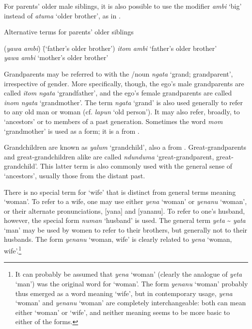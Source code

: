 For parents’ older male siblings, it is also possible to use the modifier \textit{ambi} ‘big’ instead of \textit{atuma} ‘older brother’, as in .

\ea%
    \label{ex:sem:24}
          Alternative terms for parents’ older siblings
\begin{tabbing}
{(\textit{yawa ambi})} \= {(‘father’s older brother’)}\kill
{\textit{itom ambi}} \> {‘father’s older brother’}\\
{\textit{yawa ambi}} \> {‘mother’s older brother’}
\end{tabbing}
\z

Grandparents may be referred to with the /noun \textit{ngata} ‘grand; grandparent’, irrespective of gender. More specifically, though, the ego’s male grandparents are called \textit{itom ngata} ‘grandfather’, and the ego’s female grandparents are called \textit{inom ngata} ‘grandmother’. The term \textit{ngata} ‘grand’ is also used generally to refer to any old man or woman (cf.  \textit{lapun} ‘old person’). It may also refer, broadly, to ‘ancestors’ or to members of a past generation. Sometimes the word \textit{mom} ‘grandmother’ is used as a  form; it is a  from .

  Grandchildren are known as \textit{yalum} ‘grandchild’, also a  from . \linebreak Great-grandparents and great-grandchildren alike are called \textit{ndunduma} ‘great-grandparent, great-grandchild’. This latter term is also commonly used with the general sense of ‘ancestors’, usually those from the distant past.

  There is no special term for ‘wife’ that is distinct from general terms meaning ‘woman’. To refer to a wife, one may use either \textit{yena} ‘woman’ or \textit{yenanu} ‘woman’, or their alternate pronunciations, [yana] and [yananu]. To refer to one’s husband, however, the special form \textit{numan} ‘husband’ is used. The general term \textit{yeta} {\textasciitilde} \textit{yata} ‘man’ may be used by women to refer to their brothers, but generally not to their husbands. The form \textit{yenanu} ‘woman, wife’ is clearly related to \textit{yena} ‘woman, wife’.\footnote{It can probably be assumed that \textit{yena} ‘woman’ (clearly the  analogue of \textit{yeta} ‘man’) was the original word for ‘woman’. The form \textit{yenanu} ‘woman’ probably thus emerged as a word meaning ‘wife’, but in contemporary usage, \textit{yena} ‘woman’ and \textit{yenanu} ‘woman’ are completely interchangeable: both can mean either ‘woman’ or ‘wife’, and neither meaning seems to be more basic to either of the forms.}

